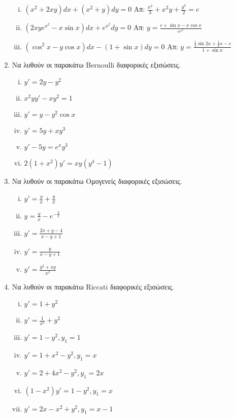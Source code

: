 \documentclass[a4paper,12pt]{article}
\begin{document}
\begin{enumerate}
\begin{enumerate}[i)]
\item $(x^2+2xy)dx+(x^2+y)dy=0$ \hfill Απ: $\frac{x^3}{3}+x^2y+\frac{y^2}{2}=c$

\item $(2xye^{x^2}-x\sin x)dx +e^{x^2}dy = 0$ \hfill Απ: $y=\frac{c+\sin x -x\cos x}{e^{x^2}}$

\item $(\cos^2x-y\cos x)dx -(1+\sin x)dy=0$ \hfill Απ: $y=\frac{\frac{1}{4}\sin 2x+\frac{1}{2}x-c}{1+\sin x}$

\end{enumerate}

\item Να λυθούν οι παρακάτω \textlatin{Bernoulli} διαφορικές εξισώσεις.

\begin{enumerate}[i)]

\item $y'=2y-y^2$
\item $x^2yy'-xy^2=1$
\item $y'=y-y^2\cos x$
\item $y'=5y+xy^3$
\item $y'-5y=e^xy^3$
\item $2(1+x^2)y'=xy(y^4-1)$

\end{enumerate}

\item Να λυθούν οι παρακάτω Ομογενείς διαφορικές εξισώσεις.

\begin{enumerate}[i)]

\item $y'=\frac{y}{x}+\frac{y}{x}$
\item $y=\frac{y}{x}-e^{-\frac{y}{x}}$
\item $y'=\frac{2x+y-4}{x-y+1}$
\item $y'=\frac{y}{x-y+1}$
\item $y'=\frac{y^2+xy}{x^2}$

\end{enumerate}

\item Να λυθούν οι παρακάτω \textlatin{Riccati} διαφορικές εξισώσεις.

\begin{enumerate}[i)]

\item $y'=1+y^2$
\item $y'=\frac{1}{x^2}+y^2$
\item $y'=1-y^2, y_1=1$
\item $y'=1+x^2-y^2, y_1=x$
\item $y'=2+4x^2-y^2, y_1=2x$
\item $(1-x^2)y'=1-y^2, y_1=x$
\item $y'=2x-x^2+y^2, y_1=x-1$

\end{enumerate}


\end{enumerate}
\end{document}
